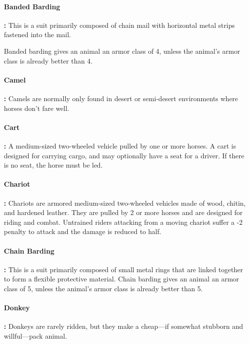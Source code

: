 \begin{multicols*}{2}
\paragraph{Banded Barding}\textbf{:} This is a suit primarily composed of chain mail with horizontal metal strips fastened into the mail.

Banded barding gives an animal an armor class of 4, unless the animal’s armor class is already better than 4.

\paragraph{Camel}\textbf{:} Camels are normally only found in desert or semi-desert environments where horses don’t fare well.

\paragraph{Cart}\textbf{:} A medium-sized two-wheeled vehicle pulled by one or more horses. A cart is designed for carrying cargo, and may optionally have a seat for a driver. If there is no seat, the horse must be led.

\paragraph{Chariot}\textbf{:} Chariots are armored medium-sized two-wheeled vehicles made of wood, chitin, and hardened leather. They are pulled by 2 or more horses and are designed for riding and combat. Untrained riders attacking from a moving chariot suffer a -2 penalty to attack and the damage is reduced to half.

\paragraph{Chain Barding}\textbf{:} This is a suit primarily composed of small metal rings that are linked together to form a flexible protective material. Chain barding gives an animal an armor class of 5, unless the animal’s armor class is already better than 5.

\paragraph{Donkey}\textbf{:} Donkeys are rarely ridden, but they make a cheap—if somewhat stubborn and willful—pack animal.


\end{multicols*}

